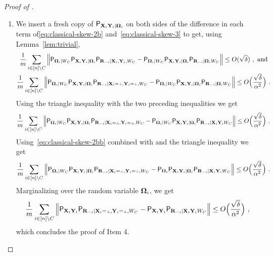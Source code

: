 \begin{proof}[Proof of ]
\begin{enumerate}
\item We insert a fresh copy of $\mathsf{P}_{\mathbf{X}_i \mathbf{Y}_i | {\boldsymbol{\Omega}}_i}$ on both sides of the difference in each term of\eqref{eq:classical-skew-2b} and~\eqref{eq:classical-skew-3} to get, using Lemma~\ref{lem:trivial},
\begin{gather*}
\frac{1}{m} \sum_{i \in [n] \setminus C} \Big \| \P_{\bOmega_i |W_C}\P_{\bX_i \bY_i | \bOmega_i}  \P_{\bR_\mi | \bX_i, \bY_i, W_C} - \P_{\bOmega_i | W_C} \P_{\bX_i \bY_i | \bOmega_i} \P_{\bR_\mi |\bOmega_i  W_C}  \Big \| \leq O(\sqrt{\delta})~, \text{ and} \\
\frac{1}{m} \sum_{i \in [n] \setminus C} \Big \| \P_{\bOmega_i |W_C}\P_{\bX_i \bY_i | \bOmega_i}  \P_{\bR_\mi | \bX_i = \dummy, \bY_i = \dummy, W_C} - \P_{\bOmega_i | W_C} \P_{\bX_i \bY_i | \bOmega_i} \P_{\bR_\mi |\bOmega_i  W_C}  \Big \| \leq O \Big( \frac{\sqrt{\delta}}{\alpha^2} \Big)~.
\end{gather*}
Using the triangle inequality with the two preceding inequalities we get
\[
\frac{1}{m} \sum_{i \in [n] \setminus C} \Big \| \P_{\bOmega_i |W_C}\P_{\bX_i \bY_i | \bOmega_i}  \P_{\bR_\mi | \bX_i = \dummy, \bY_i = \dummy, W_C} - \P_{\bOmega_i | W_C} \P_{\bX_i \bY_i | \bOmega_i} \P_{\bR_\mi | \bX_i \bY_i  W_C}  \Big \| \leq O \Big( \frac{\sqrt{\delta}}{\alpha^2} \Big)~.
\]
Using~\eqref{eq:classical-skew-2bb}  combined with  and the triangle inequality we get
\[
\frac{1}{m} \sum_{i \in [n] \setminus C} \Big \| \P_{\bOmega_i |W_C}\P_{\bX_i \bY_i | \bOmega_i}  \P_{\bR_\mi | \bX_i = \dummy, \bY_i = \dummy, W_C} - \P_{\bOmega_i} \P_{\bX_i \bY_i | \bOmega_i} \P_{\bR_\mi | \bX_i \bY_i  W_C}  \Big \| \leq O \Big( \frac{\sqrt{\delta}}{\alpha^2} \Big)~.
\]
Marginalizing over the random variable ${\boldsymbol{\Omega}}_i$, we get
\[
\frac{1}{m} \sum_{i \in [n] \setminus C} \Big \| \P_{\bX_i \bY_i}  \P_{\bR_\mi | \bX_i = \dummy, \bY_i = \dummy, W_C} - \P_{\bX_i \bY_i} \P_{\bR_\mi | \bX_i \bY_i  W_C}  \Big \| \leq O \Big( \frac{\sqrt{\delta}}{\alpha^2} \Big)~,
\]
which concludes the proof of Item 4.
\end{enumerate}
\end{proof}

